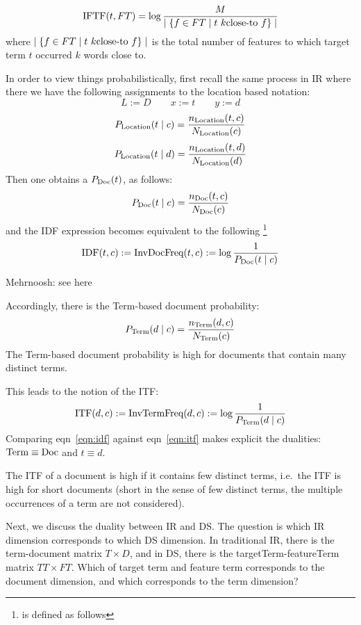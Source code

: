 \begin{equation}
\label{iftf}
\textmd{IFTF}(t, FT) = \log{{M} \over {\mid \{f \in FT \mid t  \ k\textmd{close-to} \ f \} \mid}}
\end{equation}
where $ \mid \{f \in FT \mid t  \ k\textmd{close-to} \ f \} \mid$ is the total number of features to which target  term $t$ occurred $k$ words close to. 

In order to view things probabilistically, first recall the same process in IR where there we have the following assignments to the location based notation:
\[
L := D\qquad
x := t \qquad y := d
\]
\[
P_{\textmd{Location}}(t \mid c) =  \frac{n_{\textmd{Location}}(t,c)}{N_{\textmd{Location}}(c)} 
\]
\[
P_{\textmd{Location}}(t \mid d) =  \frac{n_{\textmd{Location}}(t,d)}{N_{\textmd{Location}}(d)} 
\]
Then one obtains  a $P_{\textmd{Doc}}(t)$,  as follows:
\[
P_{\textmd{Doc}}(t\mid c) = \frac{n_{\textmd{Doc}}(t,c)}{N_{\textmd{Doc}}(c)} 
\]
and the IDF expression
becomes equivalent to the following 
\footnote{is defined as follows}
\begin{equation}
\label{eqn:idf}
\textmd{IDF}(t, c) := \textmd{InvDocFreq}(t,c) := \log{\frac{1}{P_{\textmd{Doc}}(t \mid c)}}
\end{equation}


\hrulefill Mehrnoosh: see here

Accordingly, there is the Term-based document probability:
\[
P_{\textmd{Term}}(d\mid c) = \frac{n_{\textmd{Term}}(d,c)}{N_{\textmd{Term}}(c)} 
\]
The Term-based document probability is high for documents that contain
many distinct terms.

This leads to the notion of the ITF:
\begin{equation}
\label{eqn:itf}
\textmd{ITF}(d, c) :=
	\textmd{InvTermFreq}(d,c) := \log{\frac{1}{P_{\textmd{Term}}(d \mid c)}}
\end{equation}
Comparing eqn~\ref{eqn:idf} against eqn~\ref{eqn:itf} makes explicit the
dualities: $\textmd{Term}\equiv\textmd{Doc}$ and $t\equiv d$.

The ITF of a document is high if it contains few distinct terms, i.e.~the ITF
is high for short documents (short in the sense of few distinct terms,
the multiple occurrences of a term are not considered).

Next, we discuss the duality between IR and DS.
%
The question is which IR dimension corresponds to which DS dimension.
In traditional IR, there is the term-document matrix $T\times D$, and
in DS, there is the targetTerm-featureTerm matrix $TT \times FT$.
Which of target term and feature term corresponds to the document
dimension, and which corresponds to the term dimension?

